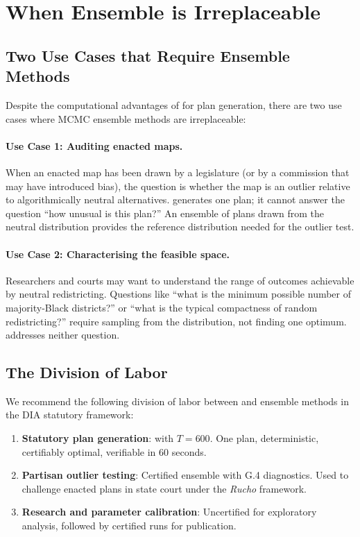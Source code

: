 \section{When Ensemble is Irreplaceable}
\label{sec:when-ensemble}

\subsection{Two Use Cases that Require Ensemble Methods}

Despite the computational advantages of \cs{} for plan generation,
there are two use cases where MCMC ensemble methods are irreplaceable:

\paragraph{Use Case 1: Auditing enacted maps.}
When an enacted map has been drawn by a legislature (or by a commission
that may have introduced bias), the question is whether the map is an
outlier relative to algorithmically neutral alternatives.
\cs{} generates one plan; it cannot answer the question ``how unusual
is this plan?''
An ensemble of plans drawn from the neutral distribution provides the
reference distribution needed for the outlier test.

\paragraph{Use Case 2: Characterising the feasible space.}
Researchers and courts may want to understand the range of outcomes
achievable by neutral redistricting.
Questions like ``what is the minimum possible number of majority-Black
districts?'' or ``what is the typical compactness of random redistricting?''
require sampling from the distribution, not finding one optimum.
\cs{} addresses neither question.

\subsection{The Division of Labor}

We recommend the following division of labor between \cs{} and ensemble
methods in the DIA statutory framework:

\begin{enumerate}
\item \textbf{Statutory plan generation}: \cs{} with $T = 600$.
      One plan, deterministic, certifiably optimal, verifiable in 60 seconds.
\item \textbf{Partisan outlier testing}: Certified \recom{} ensemble
      with G.4 diagnostics.
      Used to challenge enacted plans in state court under the
      \textit{Rucho} framework.
\item \textbf{Research and parameter calibration}: Uncertified \recom{}
      for exploratory analysis, followed by certified runs for publication.
\end{enumerate}


